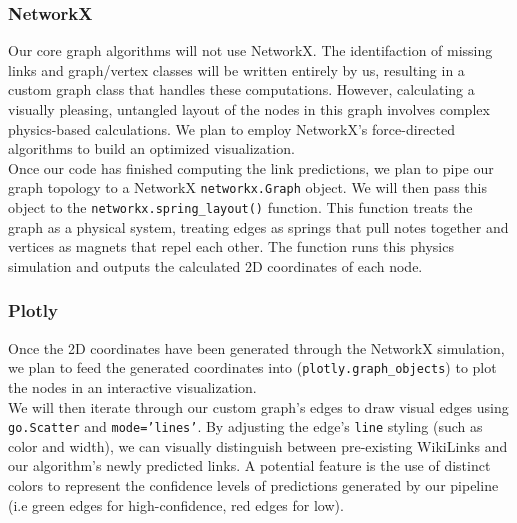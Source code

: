 \documentclass[fontsize=11pt]{article}
\begin{document}
\subsubsection*{NetworkX} 
Our core graph algorithms will not use NetworkX. The identifaction of missing links and graph/vertex classes will be written entirely by us, resulting in a custom graph class that handles these computations. However, calculating a visually pleasing, untangled layout of the nodes in this graph involves complex physics-based calculations. We plan to employ NetworkX's force-directed algorithms to build an optimized visualization. \\

\noindent Once our code has finished computing the link predictions, we plan to pipe our graph topology to a NetworkX \texttt{networkx.Graph} object. We will then pass this object to the \texttt{networkx.spring\_layout()} function. This function treats the graph as a physical system, treating edges as springs that pull notes together and vertices as magnets that repel each other. The function runs this physics simulation and outputs the calculated 2D coordinates of each node. 

\subsubsection*{Plotly}
Once the 2D coordinates have been generated through the NetworkX simulation, we plan to feed the generated coordinates into (\texttt{plotly.graph\_objects}) to plot the nodes in an interactive visualization.\\

\noindent We will then iterate through our custom graph's edges to draw visual edges using \texttt{go.Scatter} and \texttt{mode='lines'}. By adjusting the edge's \texttt{line} styling (such as color and width), we can visually distinguish between pre-existing WikiLinks and our algorithm's newly predicted links. A potential feature is the use of distinct colors to represent the confidence levels of predictions generated by our pipeline (i.e green edges for high-confidence, red edges for low).


\end{document}
